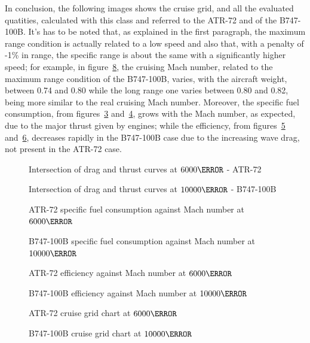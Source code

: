 \bigskip
\noindent
In conclusion, the following images shows the cruise grid, and all the evaluated quatities, calculated with this class and referred to the ATR-72 and of the B747-100B. 
%
It's has to be noted that, as explained in the first paragraph, the maximum range condition is actually related to a low speed and also that, with a penalty of -1\% in range, the specific range is about the same with a significantly higher speed; for example, in figure~\ref{fig:SpecificRangeB747}, the cruising Mach number, related to the maximum range condition of the B747-100B, varies, with the aircraft weight, between 0.74 and 0.80 while the long range one varies between 0.80 and 0.82, being more similar to the real cruising Mach number.
%
Moreover, the specific fuel consumption, from figures~\ref{fig:sfcATR} and~\ref{fig:sfcB747}, grows with the Mach number, as expected, due to the major thrust given by engines; while the efficiency, from figures~\ref{fig:EfficiencyATR} and~\ref{fig:EfficiencyB747}, decreases rapidly in the B747-100B case due to the increasing wave drag, not present in the ATR-72 case.
%
\begin{figure}[t]
\centering

\caption{Intersection of drag and thrust curves at $\si{6000}{\meter}$ - ATR-72}
\label{fig:ThrustDragATR}
\end{figure}
%
\begin{figure}[b]
\centering

\caption{Intersection of drag and thrust curves at $\si{10000}{\meter}$ - B747-100B}
\label{fig:ThrustDragB747}
\end{figure}
%
\begin{figure}[t]
\centering

\caption{ATR-72 specific fuel consumption against Mach number at $\si{6000}{\meter}$}
\label{fig:sfcATR}
\end{figure}
%
\begin{figure}[b]
\centering

\caption{B747-100B specific fuel consumption against Mach number at $\si{10000}{\meter}$}
\label{fig:sfcB747}
\end{figure}
%
\begin{figure}[t]
\centering

\caption{ATR-72 efficiency against Mach number at $\si{6000}{\meter}$}
\label{fig:EfficiencyATR}
\end{figure}
%
\begin{figure}[b]
\centering

\caption{B747-100B efficiency against Mach number at $\si{10000}{\meter}$}
\label{fig:EfficiencyB747}
\end{figure}
%
\begin{figure}[t]
\centering

\caption{ATR-72 cruise grid chart at $\si{6000}{\meter}$}
\label{fig:SpecificRangeATR}
\end{figure}
%
\begin{figure}[b]
\centering

\caption{B747-100B cruise grid chart at $\si{10000}{\meter}$}
\label{fig:SpecificRangeB747}
\end{figure}